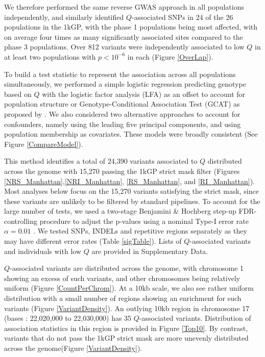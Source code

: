 \documentclass[9pt,lineno]{template}
\begin{document}
We therefore performed the same reverse GWAS approach in all populations independently, and similarly identified $Q$-associated SNPs in 24 of the 26 populations in the 1kGP, with the phase 1 populations being most affected, with on average four times as many significantly associated sites compared to the phase 3 populations.
Over 812 variants were independently associated to low $Q$ in at least two populations with $ p < 10^{-6}$ in each (Figure \ref{OverLap}).

To build a test statistic to represent the association across all populations simultaneously, we performed a simple logistic regression predicting genotype based on $Q$ with the logistic factor analysis (LFA) as an offset to account for population structure or Genotype-Conditional Association Test  (GCAT) as proposed by \citep{song2015testing}. 
We also considered two alternative approaches to account for confounders, namely using the leading five  principal components, and using population membership as covariates. 
These models were broadly consistent (See Figure \ref{CompareModel}).

This method identifies a total of 24,390 variants associated to $Q$ distributed across the genome with 15,270 passing the 1kGP strict mask filter (Figures \ref{NRS_Manhattan},\ref{NRI_Manhattan}, \ref{RS_Manhattan}, and \ref{RI_Manhattan}). Most analyses below focus on the 15,270 variants satisfying the strict mask, since these variants are unlikely to be filtered by standard pipelines.
To account for the large number of tests, we used a two-stage Benjamini \& Hochberg step-up FDR-controlling procedure to adjust the p-values using a nominal Type-I error rate $\alpha = 0.01$ \citep{Benjamini2006}. 
We tested SNPs, INDELs and repetitive regions separately as they may have different error rates (Table \ref{sigTable}).
Lists of $Q$-associated variants and individuals with low $Q$ are provided in Supplementary Data.

$Q$-associated variants are distributed across the genome, with chromosome 1 showing an excess of such variants, and other chromosomes being relatively uniform (Figure \ref{CountPerChrom}).
At a 10kb scale, we also see rather uniform distribution with a small number of regions showing an enrichment for such variants (Figure \ref{VariantDensity}).
An outlying 10kb region in chromosome 17 (bases : 22,020,000 to  22,030,000) has 35 $Q$-associated variants.
Distribution of association statistics in this region is provided in Figure \ref{Top10}.
By contrast, variants that do not pass the 1kGP strict mask are more unevenly distributed across the genome(Figure \ref{VariantDensity}).
\end{document}
